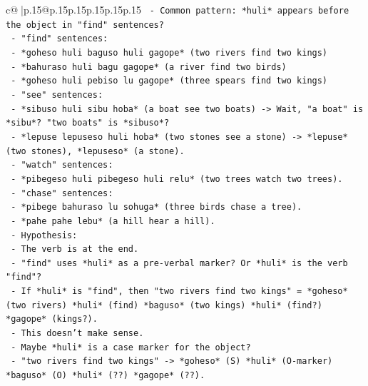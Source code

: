 \documentclass{article}
\begin{document}
{\begin{supertabular}{c@{$\;$}|p{.15\linewidth}@{}p{.15\linewidth}p{.15\linewidth}p{.15\linewidth}p{.15\linewidth}p{.15\linewidth}}
{{{\texttt{                        {-} Common pattern: *huli* appears before the object in "find" sentences?} \\
\texttt{                        {-} "find" sentences:} \\
\texttt{                          {-} *goheso huli baguso huli gagope* (two rivers find two kings)} \\
\texttt{                          {-} *bahuraso huli bagu gagope* (a river find two birds)} \\
\texttt{                          {-} *goheso huli pebiso lu gagope* (three spears find two kings)} \\
\texttt{                        {-} "see" sentences:} \\
\texttt{                          {-} *sibuso huli sibu hoba* (a boat see two boats) {-}> Wait, "a boat" is *sibu*? "two boats" is *sibuso*?} \\
\texttt{                          {-} *lepuse lepuseso huli hoba* (two stones see a stone) {-}> *lepuse* (two stones), *lepuseso* (a stone).} \\
\texttt{                        {-} "watch" sentences:} \\
\texttt{                          {-} *pibegeso huli pibegeso huli relu* (two trees watch two trees).} \\
\texttt{                        {-} "chase" sentences:} \\
\texttt{                          {-} *pibege bahuraso lu sohuga* (three birds chase a tree).} \\
\texttt{                          {-} *pahe pahe lebu* (a hill hear a hill).} \\
\texttt{                        {-} Hypothesis:} \\
\texttt{                          {-} The verb is at the end.} \\
\texttt{                          {-} "find" uses *huli* as a pre{-}verbal marker? Or *huli* is the verb "find"?} \\
\texttt{                          {-} If *huli* is "find", then "two rivers find two kings" = *goheso* (two rivers) *huli* (find) *baguso* (two kings) *huli* (find?) *gagope* (kings?).} \\
\texttt{                          {-} This doesn't make sense.} \\
\texttt{                          {-} Maybe *huli* is a case marker for the object?} \\
\texttt{                          {-} "two rivers find two kings" {-}> *goheso* (S) *huli* (O{-}marker) *baguso* (O) *huli* (??) *gagope* (??).} \\
}}}
\end{supertabular}}
\end{document}
